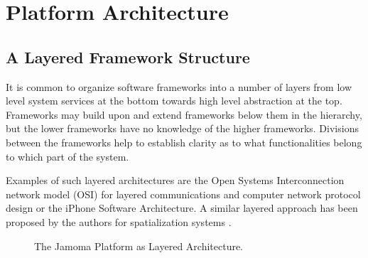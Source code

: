 \documentclass[twoside,10pt]{article}
\begin{document}

\section{Platform Architecture} %

\subsection{A Layered Framework Structure}

It is common to organize software frameworks into a number of layers from low level system services at the bottom towards high level abstraction at the top.  Frameworks may build upon and extend frameworks below them in the hierarchy, but the lower frameworks have no knowledge of the higher frameworks. Divisions between the frameworks help to establish clarity as to what functionalities belong to which part of the system. 

Examples of such layered architectures are the Open Systems Interconnection network model (OSI) \cite{web6} 
for layered communications and computer network protocol design or the iPhone Software Architecture. A similar layered approach has been proposed by the authors for spatialization systems \cite{Peters:2009}. 

\begin{figure}[htbp]
\centerline{}
\caption{The Jamoma Platform as Layered Architecture.}
\label{fig:layers}
\end{figure}
\end{document}
